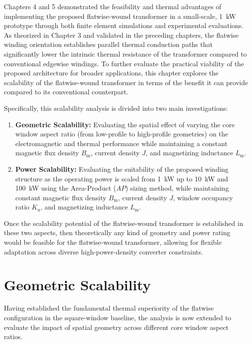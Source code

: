 Chapters 4 and 5 demonstrated the feasibility and thermal advantages of implementing the proposed flatwise-wound transformer in a small-scale, 1~kW prototype through both finite element simulations and experimental evaluations. As theorized in Chapter 3 and validated in the preceding chapters, the flatwise winding orientation establishes parallel thermal conduction paths that significantly lower the intrinsic thermal resistance of the transformer compared to conventional edgewise windings. To further evaluate the practical viability of the proposed architecture for broader applications, this chapter explores the scalability of the flatwise-wound transformer in terms of the benefit it can provide compared to its conventional counterpart.

Specifically, this scalability analysis is divided into two main investigations:
\begin{enumerate}
    \item \textbf{Geometric Scalability:} Evaluating the spatial effect of varying the core window aspect ratio (from low-profile to high-profile geometries) on the electromagnetic and thermal performance while maintaining a constant magnetic flux density $B_{\mathrm{m}}$, current density $J$, and magnetizing inductance $L_{\mathrm{m}}$.
    \item \textbf{Power Scalability:} Evaluating the suitability of the proposed winding structure as the operating power is scaled from 1~kW up to 10~kW and 100~kW using the Area-Product ($AP$) sizing method, while maintaining constant magnetic flux density $B_{\mathrm{m}}$, current density $J$, window occupancy ratio $K_\mathrm{u}$, and magnetizing inductance $L_{\mathrm{m}}$.
\end{enumerate}
Once the scalability potential of the flatwise-wound transformer is established in these two aspects, then theoretically any kind of geometry and power rating would be feasible for the flatwise-wound transformer, allowing for flexible adaptation across diverse high-power-density converter constraints.

\section{Geometric Scalability}
Having established the fundamental thermal superiority of the flatwise configuration in the square-window baseline, the analysis is now extended to evaluate the impact of spatial geometry across different core window aspect ratios.

